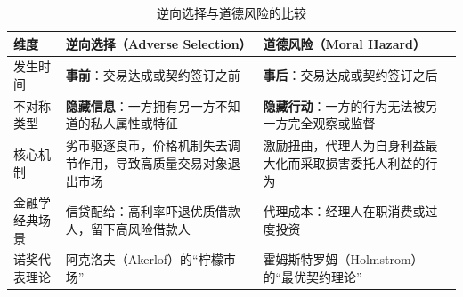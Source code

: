 \begin{table}
  \centering
  \caption{逆向选择与道德风险的比较}
  \label{tab:adverse_selection_vs_moral_hazard}
  \scriptsize
  \begin{tabular}{p{2.2cm} p{4.8cm} p{4.8cm}}
    \toprule
    \textbf{维度} & \textbf{逆向选择（Adverse Selection）} & \textbf{道德风险（Moral Hazard）} \\
    \midrule
    发生时间 & \textbf{事前}：交易达成或契约签订之前 & \textbf{事后}：交易达成或契约签订之后 \\
    不对称类型 & \textbf{隐藏信息}：一方拥有另一方不知道的私人属性或特征 & \textbf{隐藏行动}：一方的行为无法被另一方完全观察或监督 \\
    核心机制 & 劣币驱逐良币，价格机制失去调节作用，导致高质量交易对象退出市场 & 激励扭曲，代理人为自身利益最大化而采取损害委托人利益的行为 \\
    金融学经典场景 & 信贷配给：高利率吓退优质借款人，留下高风险借款人 & 代理成本：经理人在职消费或过度投资 \\
    诺奖代表理论 & 阿克洛夫（Akerlof）的“柠檬市场” & 霍姆斯特罗姆（Holmstrom）的“最优契约理论” \\
    \bottomrule
  \end{tabular}
\end{table}
